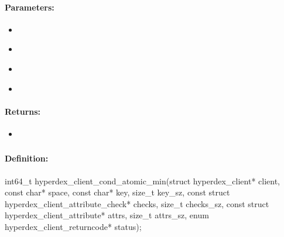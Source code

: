 \paragraph{Parameters:}
\begin{itemize}[noitemsep]
\item {}\\

\item {}\\

\item {}\\

\item {}\\

\end{itemize}

\paragraph{Returns:}
\begin{itemize}[noitemsep]
\item {}\\

\end{itemize}

\pagebreak
\subsubsection{}
\label{api:c:cond_atomic_min}


\paragraph{Definition:}
\begin{ccode}
int64_t hyperdex_client_cond_atomic_min(struct hyperdex_client* client,
        const char* space,
        const char* key, size_t key_sz,
        const struct hyperdex_client_attribute_check* checks, size_t checks_sz,
        const struct hyperdex_client_attribute* attrs, size_t attrs_sz,
        enum hyperdex_client_returncode* status);
\end{ccode}

